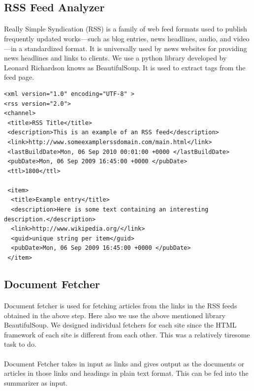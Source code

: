 \subsection{RSS Feed Analyzer}
\paragraph{} Really Simple Syndication (RSS) is a family of web feed formats used to publish frequently updated works—such as blog entries, news headlines, audio, and video—in a standardized format. It is universally used by news websites for providing news headlines and links to clients. We use a python library developed by Leonard Richardson knows as BeautifulSoup\cite{BeautifulSoup}. It is used to extract tags from the feed page.
\begin{lstlisting}
<xml version="1.0" encoding="UTF-8" >
<rss version="2.0">
<channel>
 <title>RSS Title</title>
 <description>This is an example of an RSS feed</description>
 <link>http://www.someexamplerssdomain.com/main.html</link>
 <lastBuildDate>Mon, 06 Sep 2010 00:01:00 +0000 </lastBuildDate>
 <pubDate>Mon, 06 Sep 2009 16:45:00 +0000 </pubDate>
 <ttl>1800</ttl>
 
 <item>
  <title>Example entry</title>
  <description>Here is some text containing an interesting description.</description>
  <link>http://www.wikipedia.org/</link>
  <guid>unique string per item</guid>
  <pubDate>Mon, 06 Sep 2009 16:45:00 +0000 </pubDate>
 </item>
\end{lstlisting}
\subsection{Document Fetcher}
\paragraph{}Document fetcher is used for fetching articles from the links in the RSS feeds obtained in the above step. Here also we use the above mentioned library BeautifulSoup\cite{BeautifulSoup}. We designed individual fetchers for each site since the HTML framework of each site is different from each other. This was a relatively tiresome task to do.
\paragraph{}	Document Fetcher takes in input as links and gives output as the documents or articles in those links and headings in plain text format. This can be fed into the summarizer as input.
